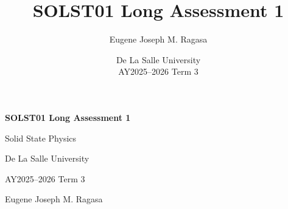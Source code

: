 \documentclass[11pt]{article}
\title{SOLST01 Long Assessment 1}
\author{Eugene Joseph M. Ragasa}
\date{De La Salle University \\ AY2025--2026 Term 3}
\begin{document}
\begin{titlepage}
    \centering

    \vspace*{1.5cm}

    {\Large \textbf{SOLST01 Long Assessment 1}\par}
    \vspace{0.3cm}

    {\large Solid State Physics\par}
    \vspace{0.2cm}

    {De La Salle University\par}
    {AY2025--2026 Term 3\par}
    \vspace{0.5cm}

    {Eugene Joseph M. Ragasa\par}

    \vspace{1.5cm}

    \tableofcontents

    \vfill
\end{titlepage}



\clearpage


\clearpage


\clearpage


\clearpage


\clearpage


\clearpage


\clearpage


\clearpage
{}
\nocite{*}


\end{document}
